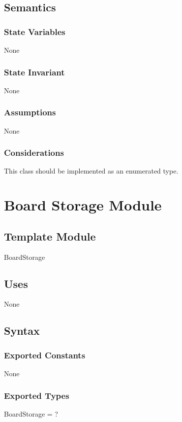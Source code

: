 \documentclass{article}
\begin{document}
	\subsection*{Semantics}

		\subsubsection*{State Variables}
			None

		\subsubsection*{State Invariant}
			None

		\subsubsection*{Assumptions}
			None

		\subsubsection*{Considerations}
			This class should be implemented as an enumerated type.

\newpage

\section*{Board Storage Module}

	\subsection*{Template Module}
		BoardStorage

	\subsection*{Uses}
		None

	\subsection*{Syntax}

		\subsubsection*{Exported Constants}
			None

		\subsubsection*{Exported Types}
			BoardStorage = ?
\end{document}
